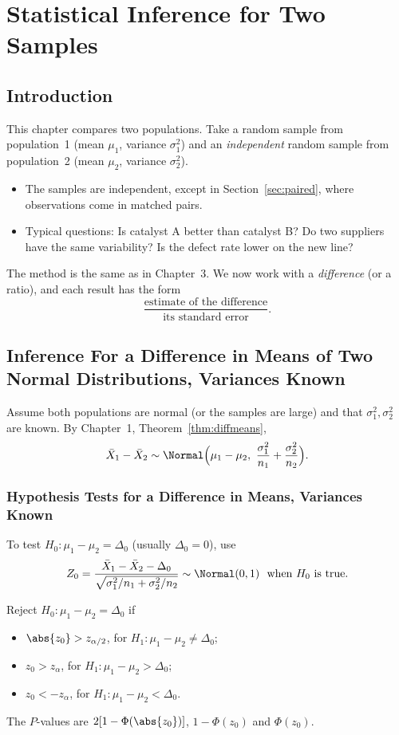 \chapter{Statistical Inference for Two Samples}

\section{Introduction}

This chapter compares two populations. Take a random sample from population~1 (mean $\mu_1$, variance $\sigma_1^2$) and an \emph{independent} random sample from population~2 (mean $\mu_2$, variance $\sigma_2^2$).

\begin{itemize}
  \item The samples are independent, except in Section~\ref{sec:paired}, where observations come in matched pairs.
  \item Typical questions: Is catalyst A better than catalyst B? Do two suppliers have the same variability? Is the defect rate lower on the new line?
\end{itemize}

The method is the same as in Chapter~3. We now work with a \emph{difference} (or a ratio), and each result has the form
\[ \frac{\text{estimate of the difference}}{\text{its standard error}}. \]

\section{Inference For a Difference in Means of Two Normal Distributions, Variances Known}

Assume both populations are normal (or the samples are large) and that $\sigma_1^2,\sigma_2^2$ are known. By Chapter~1, Theorem~\ref{thm:diffmeans},
\[ \bar{X}_1-\bar{X}_2\sim\Normal\Big(\mu_1-\mu_2,\ \frac{\sigma_1^2}{n_1}+\frac{\sigma_2^2}{n_2}\Big). \]

\subsection{Hypothesis Tests for a Difference in Means, Variances Known}

To test $H_0:\mu_1-\mu_2=\Delta_0$ (usually $\Delta_0=0$), use
\[ Z_0=\frac{\bar{X}_1-\bar{X}_2-\Delta_0}{\sqrt{\sigma_1^2/n_1+\sigma_2^2/n_2}}\sim\Normal(0,1)\ \text{ when }H_0\text{ is true.} \]

\begin{theorem}\label{thm:twoz}
Reject $H_0:\mu_1-\mu_2=\Delta_0$ if
\begin{itemize}
  \item $\abs{z_0}>z_{\alpha/2}$, for $H_1:\mu_1-\mu_2\ne\Delta_0$;
  \item $z_0>z_\alpha$, for $H_1:\mu_1-\mu_2>\Delta_0$;
  \item $z_0<-z_\alpha$, for $H_1:\mu_1-\mu_2<\Delta_0$.
\end{itemize}
The $P$-values are $2[1-\Phi(\abs{z_0})]$, $1-\Phi(z_0)$ and $\Phi(z_0)$.
\end{theorem}

